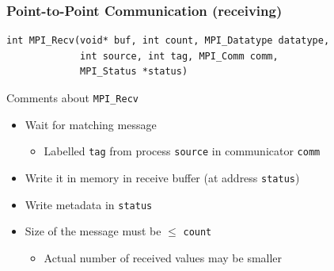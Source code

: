 \documentclass[xcolor={x11names,svgnames,psnames}]{beamer}
\begin{document}
\begin{frame}[fragile=singleslide]
  \frametitle{Point-to-Point Communication (receiving)}

\begin{verbatim}
int MPI_Recv(void* buf, int count, MPI_Datatype datatype,
             int source, int tag, MPI_Comm comm,
             MPI_Status *status)
\end{verbatim}

  \begin{block}{Comments about \texttt{MPI_Recv}}
    \begin{itemize}
    \item Wait for \alert{matching} message
      \begin{itemize}
      \item Labelled \texttt{tag} from process \texttt{source} in communicator \texttt{comm}
      \end{itemize}
    \item Write it in memory in \alert{receive buffer} (at address \texttt{status})
    \item Write metadata in \texttt{status}
    \item Size of the message must be $\leq$ \texttt{count}
      \begin{itemize}
      \item Actual number of received values may be smaller
      \end{itemize}    
    \end{itemize}
  \end{block}
\end{frame}

\end{document}
